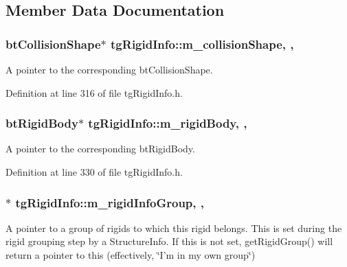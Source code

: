\subsection{Member Data Documentation}
\hypertarget{classtg_rigid_info_a8a1c3ca00fe917c90d035e2ac101d4b1}{
\subsubsection[{m\-\_\-collision\-Shape}]{\setlength{\rightskip}{0pt plus 5cm}bt\-Collision\-Shape$\ast$ tg\-Rigid\-Info\-::m\-\_\-collision\-Shape\hspace{0.3cm}{\ttfamily [mutable]}, {\ttfamily [protected]}, {\ttfamily [inherited]}}}\label{classtg_rigid_info_a8a1c3ca00fe917c90d035e2ac101d4b1}
A pointer to the corresponding bt\-Collision\-Shape. 

Definition at line 316 of file tg\-Rigid\-Info.\-h.

\hypertarget{classtg_rigid_info_ab6e331d7cb329704f24a069ff3c309f3}{
\subsubsection[{m\-\_\-rigid\-Body}]{\setlength{\rightskip}{0pt plus 5cm}bt\-Rigid\-Body$\ast$ tg\-Rigid\-Info\-::m\-\_\-rigid\-Body\hspace{0.3cm}{\ttfamily [mutable]}, {\ttfamily [protected]}, {\ttfamily [inherited]}}}\label{classtg_rigid_info_ab6e331d7cb329704f24a069ff3c309f3}
A pointer to the corresponding bt\-Rigid\-Body. 

Definition at line 330 of file tg\-Rigid\-Info.\-h.

\hypertarget{classtg_rigid_info_a410205a69125205c4d63883e1fcfb0ae}{
\subsubsection[{m\-\_\-rigid\-Info\-Group}]{$\ast$ tg\-Rigid\-Info\-::m\-\_\-rigid\-Info\-Group\hspace{0.3cm}{\ttfamily [mutable]}, {\ttfamily [protected]}, {\ttfamily [inherited]}}}\label{classtg_rigid_info_a410205a69125205c4d63883e1fcfb0ae}
A pointer to a group of rigids to which this rigid belongs. This is set during the rigid grouping step by a Structure\-Info. If this is not set, get\-Rigid\-Group() will return a pointer to this (effectively, \char`\"{}\-I'm in my own group\char`\"{}) 

